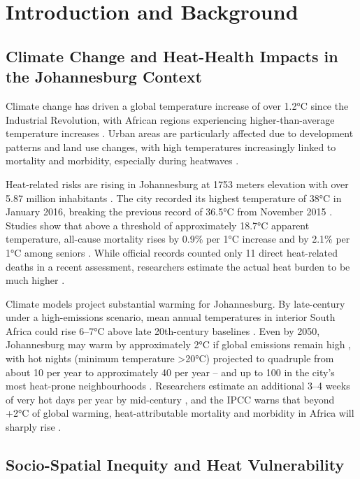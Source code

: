 \section{Introduction and Background}

\subsection{Climate Change and Heat-Health Impacts in the Johannesburg Context}

Climate change has driven a global temperature increase of over 1.2°C since the Industrial Revolution, with African regions experiencing higher-than-average temperature increases \citep{IPCC2024}. Urban areas are particularly affected due to development patterns and land use changes, with high temperatures increasingly linked to mortality and morbidity, especially during heatwaves \citep{Gasparrini2015, Analitis2018, Romanello2023}.

Heat-related risks are rising in Johannesburg at 1753 meters elevation with over 5.87 million inhabitants \citep{Worldometer2023}. The city recorded its highest temperature of 38°C in January 2016, breaking the previous record of 36.5°C from November 2015 \citep{Strydom2016}. Studies show that above a threshold of approximately 18.7°C apparent temperature, all-cause mortality rises by 0.9\% per 1°C increase and by 2.1\% per 1°C among seniors \citep{Wichmann2017, Scovronick2018}. While official records counted only 11 direct heat-related deaths in a recent assessment, researchers estimate the actual heat burden to be much higher \citep{Chersich2023}.

Climate models project substantial warming for Johannesburg. By late-century under a high-emissions scenario, mean annual temperatures in interior South Africa could rise 6--7°C above late 20th-century baselines \citep{Engelbrecht2015}. Even by 2050, Johannesburg may warm by approximately 2°C if global emissions remain high \citep{Engelbrecht2015, Souverijns2022}, with hot nights (minimum temperature >20°C) projected to quadruple from about 10 per year to approximately 40 per year -- and up to 100 in the city's most heat-prone neighbourhoods \citep{WorldBank2024}. Researchers estimate an additional 3--4 weeks of very hot days per year by mid-century \citep{Garland2015}, and the IPCC warns that beyond +2°C of global warming, heat-attributable mortality and morbidity in Africa will sharply rise \citep{IPCC2022}.

\subsection{Socio-Spatial Inequity and Heat Vulnerability}

